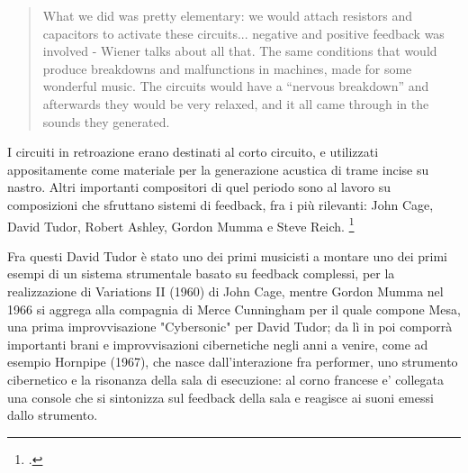 %

\begin{quote}
What we did was pretty elementary: we would attach resistors and capacitors
to activate these
circuits... negative and positive feedback was involved - Wiener
talks about all that. The same
conditions that would produce breakdowns and malfunctions in machines,
made for some
wonderful music. The circuits would have a “nervous breakdown”
and afterwards they would be
very relaxed, and it all came through in the sounds they generated.
\end{quote}

I circuiti in retroazione erano destinati al corto circuito,
e utilizzati appositamente come materiale per la generazione acustica
di trame incise su nastro.
Altri importanti compositori di quel periodo sono al lavoro su composizioni
che sfruttano sistemi di feedback, fra i più rilevanti:
John Cage, David Tudor, Robert Ashley, Gordon Mumma e Steve Reich. \footcite{sanfilippovallefeedsys} 

Fra questi David Tudor è stato uno dei primi musicisti a montare uno dei primi esempi di un sistema strumentale
basato su feedback complessi, per la realizzazione di Variations II (1960) di John Cage,
mentre Gordon Mumma nel 1966 si aggrega alla compagnia di Merce Cunningham per il quale compone Mesa, 
una prima improvvisazione "Cybersonic" per David Tudor; da lì in poi comporrà importanti 
brani e improvvisazioni cibernetiche negli anni a venire, come ad esempio Hornpipe (1967), 
che nasce dall'interazione fra performer, uno strumento cibernetico e la risonanza della sala di esecuzione: 
al corno francese e' collegata una console che si sintonizza sul feedback 
della sala e reagisce ai suoni emessi dallo strumento. 

